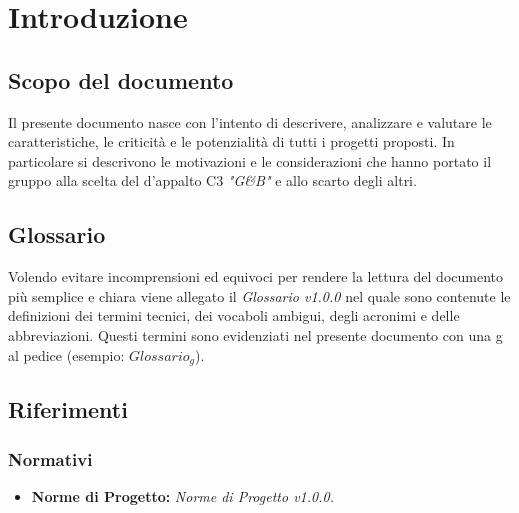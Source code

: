 \section{Introduzione}
	\subsection{Scopo del documento}
	Il presente documento nasce con l'intento di descrivere, analizzare e valutare le caratteristiche, le criticità e le potenzialità di tutti i progetti proposti. In particolare si descrivono le motivazioni e le considerazioni che hanno portato il gruppo alla scelta del  d'appalto C3 \emph{"G\&B"} e allo scarto degli altri.
	\subsection{Glossario}
	Volendo evitare incomprensioni  ed equivoci per rendere la lettura del documento più semplice e chiara viene allegato il \emph{Glossario v1.0.0} nel quale sono contenute le definizioni dei termini tecnici, dei vocaboli ambigui, degli acronimi e delle abbreviazioni. Questi termini sono evidenziati nel presente documento con una g al pedice (esempio: $Glossario_{g}$).  
	\subsection{Riferimenti}
		\subsubsection{Normativi}
		\begin{itemize}
			\item \textbf{Norme di Progetto:} \emph{Norme di Progetto v1.0.0.}
		\end{itemize}
		

